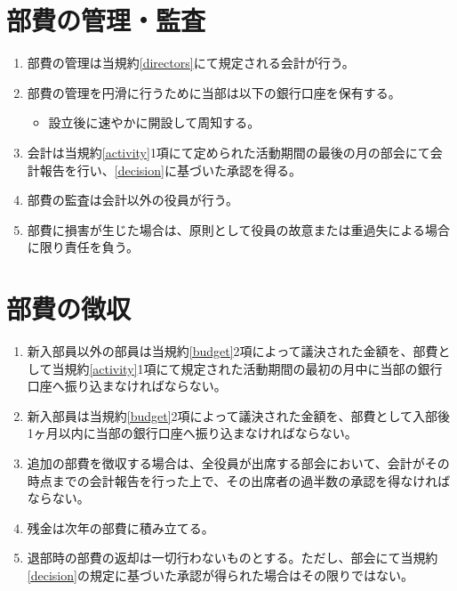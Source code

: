 \documentclass[12pt, unicode, a4paper]{ltjsreport}
\begin{document}
    \section{部費の管理・監査}
        \begin{enumerate}
            \item 部費の管理は当規約\ref{directors}にて規定される会計が行う。
            \item 部費の管理を円滑に行うために当部は以下の銀行口座を保有する。
            \begin{itemize}
                \item 設立後に速やかに開設して周知する。
            \end{itemize}
            \item 会計は当規約\ref{activity}1項にて定められた活動期間の最後の月の部会にて会計報告を行い、\ref{decision}に基づいた承認を得る。
            \item 部費の監査は会計以外の役員が行う。
            \item 部費に損害が生じた場合は、原則として役員の故意または重過失による場合に限り責任を負う。
        \end{enumerate}

    \section{部費の徴収}
        \begin{enumerate}
            \item 新入部員以外の部員は当規約\ref{budget}2項によって議決された金額を、部費として当規約\ref{activity}1項にて規定された活動期間の最初の月中に当部の銀行口座へ振り込まなければならない。
            \item 新入部員は当規約\ref{budget}2項によって議決された金額を、部費として入部後1ヶ月以内に当部の銀行口座へ振り込まなければならない。
            \item 追加の部費を徴収する場合は、全役員が出席する部会において、会計がその時点までの会計報告を行った上で、その出席者の過半数の承認を得なければならない。
            \item 残金は次年の部費に積み立てる。
            \item 退部時の部費の返却は一切行わないものとする。ただし、部会にて当規約\ref{decision}の規定に基づいた承認が得られた場合はその限りではない。
        \end{enumerate}
\end{document}

